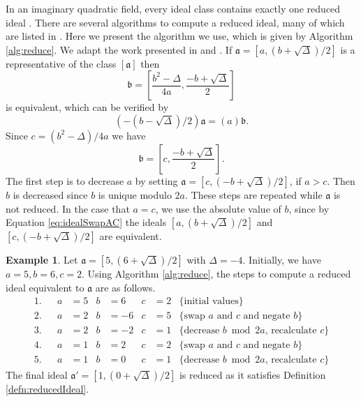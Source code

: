 \documentclass{ucalgthes1}
\theoremstyle{definition}
\newtheorem{example}[thm]{Example}
\newcommand{\ideal}{\mathfrak}
\newcommand{\idealclass}[1]{\left[ \ideal #1 \right]}
\newcommand{\aclass}{\idealclass a}
\begin{document}
In an imaginary quadratic field, every ideal class contains exactly one reduced ideal \cite[p.20]{Ramachandran2006}.  There are several algorithms to compute a reduced ideal, many of which are listed in \cite{Jacobson2006}.  Here we present the algorithm we use, which is given by Algorithm \ref{alg:reduce}.  We adapt the work presented in \cite[p.90]{Jacobson2006} and \cite[p.99]{Jacobson2009}. If $\ideal a = [a, (b + \sqrt\Delta)/2]$ is a representative of the class $\aclass$ then
\begin{equation}
\label{eq:idealSwapNorm}
	\ideal b = \left[ \frac{b^2-\Delta}{4a}, \frac{-b + \sqrt\Delta}{2} \right]
\end{equation}
is equivalent, which can be verified by
\[
	\left(-(b - \sqrt\Delta)/2 \right) \ideal a = (a) \ideal b.
\]
Since $c = (b^2 - \Delta)/4a$ we have
\begin{equation}
\label{eq:idealSwapAC}
	\ideal b = \left[ c, \frac{-b + \sqrt\Delta}{2} \right].
\end{equation}
The first step is to decrease $a$ by setting $\ideal a = [c, (-b + \sqrt\Delta)/2]$, if $a > c$.  Then $b$ is decreased since $b$ is unique modulo $2a$.  These steps are repeated while $\ideal a$ is not reduced. In the case that $a = c$, we use the absolute value of $b$, since by Equation \ref{eq:idealSwapAC} the ideals $[a, (b + \sqrt\Delta)/2]$ and $[c, (-b+\sqrt\Delta)/2]$ are equivalent.  

\begin{example}
Let $\ideal a = [5, (6 + \sqrt{\Delta})/2]$ with $\Delta = -4$.  Initially, we have $a = 5, b = 6, c = 2$.  Using Algorithm \ref{alg:reduce}, the steps to compute a reduced ideal equivalent to $\ideal a$ are as follows.
\begin{align*}
1. && a &= 5 &b &= 6 &c &= 2 & \textrm{\{initial values\}} \\
2. && a &= 2 &b &= -6 &c &= 5 & \textrm{\{swap $a$ and $c$ and negate $b$\}} \\
3. && a &= 2 &b &= -2 &c &= 1 & \textrm{\{decrease $b \bmod 2a$, recalculate $c$\}} \\
4. && a &= 1 &b &= 2  &c &= 2 & \textrm{\{swap $a$ and $c$ and negate $b$\}} \\
5. && a &= 1 &b &= 0  &c &= 1 & \textrm{\{decrease $b \bmod 2a$, recalculate $c$\}}
\end{align*}
The final ideal $\ideal{a'} = [1, (0 + \sqrt \Delta)/2]$ is reduced as it satisfies Definition \ref{defn:reducedIdeal}.
\end{example}
\end{document}
